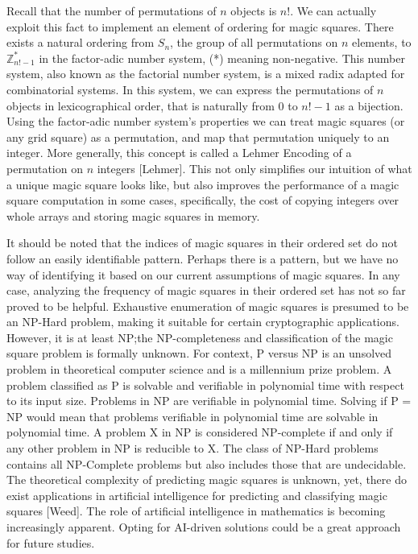 \documentclass[12pt]{report}
\begin{document}
\par Recall that the number of permutations of $n$ objects is $n$!. We can actually exploit this
fact to implement an element of ordering for magic squares. There exists a natural ordering from
$S_n$, the group of all permutations on $n$ elements, to $\mathbb{Z}^{*}_{n!-1}$  in the
factor-adic number system, (*) meaning non-negative. This number system, also known as the
factorial number system, is a mixed radix adapted for combinatorial systems. In this system, we can
express the permutations of $n$ objects in lexicographical order, that is naturally from $0$ to
$n!-1$ as a bijection. Using the factor-adic number system's properties we can treat magic squares
(or any grid square) as a permutation, and map that permutation uniquely to an integer. More
generally, this concept is called a Lehmer Encoding of a permutation on $n$ integers [Lehmer]. This
not only simplifies our intuition of what a unique magic square looks like, but also improves the
performance of a magic square computation in some cases, specifically, the cost of copying integers
over whole arrays and storing magic squares in memory.

\par It should be noted that the indices of magic squares in their ordered set do not follow an
easily identifiable pattern. Perhaps there is a pattern, but we have no way of identifying it based
on our current assumptions of magic squares. In any case, analyzing the frequency of magic squares
in their ordered set has not so far proved to be helpful. Exhaustive enumeration of magic squares
is presumed to be an NP-Hard problem, making it suitable for certain cryptographic applications. 
However, it is at least NP;\@ the NP-completeness and classification of the magic square problem is
formally unknown. For context, P versus NP is an unsolved problem in theoretical computer science and is a millennium prize problem.
A problem classified as P is solvable and verifiable in polynomial time with respect to its input size.
Problems in NP are verifiable in polynomial time. Solving if P = NP would mean that problems verifiable
in polynomial time are solvable in polynomial time. A problem X in NP is considered NP-complete if and only if 
any other problem in NP is reducible to X. The class of NP-Hard problems contains all NP-Complete problems but also
includes those that are undecidable. The theoretical complexity of predicting magic squares is unknown, yet, there do exist
applications in artificial intelligence for predicting and classifying magic squares [Weed]. The role
of artificial intelligence in mathematics is becoming increasingly apparent. Opting for AI-driven
solutions could be a great approach for future studies.
\end{document}
